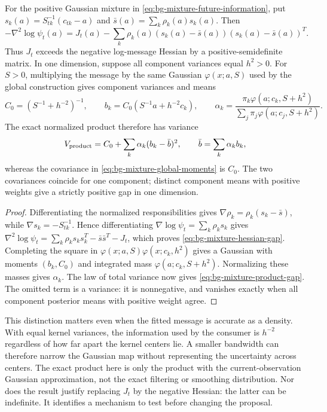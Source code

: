\begin{proposition}
\label{prop:bg-mixture-information-gap}
For the positive Gaussian mixture in
\eqref{eq:bg-mixture-future-information}, put
$s_k(a)=S_{tk}^{-1}(c_{tk}-a)$ and $\bar s(a)=\sum_k\rho_k(a)s_k(a)$.
Then
\begin{equation}
 -\nabla^2\log\psi_t(a)
 =J_t(a)-\sum_k\rho_k(a)(s_k(a)-\bar s(a))(s_k(a)-\bar s(a))^T.
 \label{eq:bg-mixture-hessian-gap}
\end{equation}
Thus $J_t$ exceeds the negative log-message Hessian by a positive-semidefinite
matrix. In one dimension, suppose all component variances equal $h^2>0$.
For $S>0$, multiplying the message by the same Gaussian $\varphi(x;a,S)$ used by the
global construction gives component variances and means
\[
 C_0=(S^{-1}+h^{-2})^{-1},\qquad
 b_k=C_0(S^{-1}a+h^{-2}c_k),
 \qquad
 \alpha_k=\frac{\pi_k\varphi(a;c_k,S+h^2)}
 {\sum_j\pi_j\varphi(a;c_j,S+h^2)}.
\]
The exact normalized product therefore has variance
\begin{equation}
 V_{\rm product}=C_0+\sum_k\alpha_k(b_k-\bar b)^2,
 \qquad \bar b=\sum_k\alpha_kb_k,
 \label{eq:bg-mixture-product-gap}
\end{equation}
whereas the covariance in \eqref{eq:bg-mixture-global-moments} is $C_0$.
The two covariances coincide for one component; distinct component means with
positive weights give a strictly positive gap in one dimension.
\end{proposition}
\begin{proof}
Differentiating the normalized responsibilities gives
$\nabla\rho_k=\rho_k(s_k-\bar s)$, while
$\nabla s_k=-S_{tk}^{-1}$. Hence differentiating
$\nabla\log\psi_t=\sum_k\rho_ks_k$ gives
$\nabla^2\log\psi_t=\sum_k\rho_ks_ks_k^T-\bar s\bar s^T-J_t$,
which proves \eqref{eq:bg-mixture-hessian-gap}. Completing the square in
$\varphi(x;a,S)\varphi(x;c_k,h^2)$ gives a Gaussian with moments
$(b_k,C_0)$ and integrated mass $\varphi(a;c_k,S+h^2)$.
Normalizing these masses gives $\alpha_k$. The law of total variance now
gives \eqref{eq:bg-mixture-product-gap}. The omitted term is a variance:
it is nonnegative, and vanishes exactly when all component posterior means
with positive weight agree.
\end{proof}

This distinction matters even when the fitted message is accurate as a
density. With equal kernel variances, the information used by the consumer is
$h^{-2}$ regardless of how far apart the kernel centers lie. A smaller
bandwidth can therefore narrow the Gaussian map without representing the
uncertainty across centers. The exact product here is only the product with
the current-observation Gaussian approximation, not the exact filtering or
smoothing distribution. Nor does the result justify replacing $J_t$ by the
negative Hessian: the latter can be indefinite. It identifies a mechanism to
test before changing the proposal.

